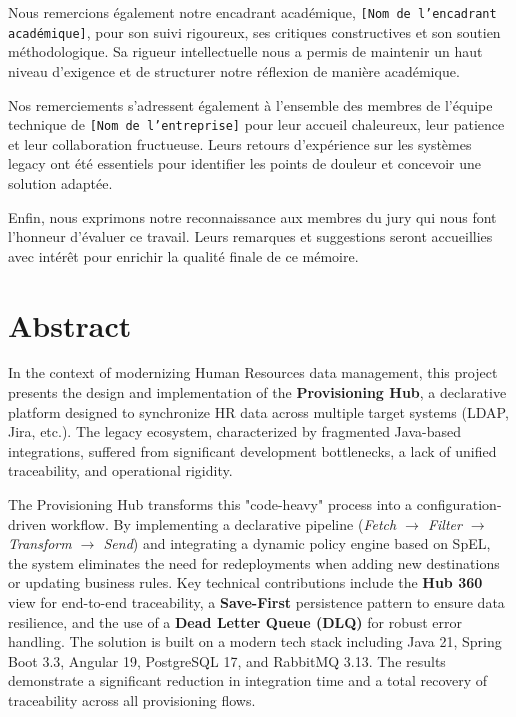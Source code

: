 Nous remercions également notre encadrant académique, \texttt{[Nom de l'encadrant académique]}, pour son suivi rigoureux, ses critiques constructives et son soutien méthodologique. Sa rigueur intellectuelle nous a permis de maintenir un haut niveau d'exigence et de structurer notre réflexion de manière académique.

Nos remerciements s'adressent également à l'ensemble des membres de l'équipe technique de \texttt{[Nom de l'entreprise]} pour leur accueil chaleureux, leur patience et leur collaboration fructueuse. Leurs retours d'expérience sur les systèmes legacy ont été essentiels pour identifier les points de douleur et concevoir une solution adaptée.

Enfin, nous exprimons notre reconnaissance aux membres du jury qui nous font l'honneur d'évaluer ce travail. Leurs remarques et suggestions seront accueillies avec intérêt pour enrichir la qualité finale de ce mémoire.
\newpage

\chapter*{Abstract}
In the context of modernizing Human Resources data management, this project presents the design and implementation of the \textbf{Provisioning Hub}, a declarative platform designed to synchronize HR data across multiple target systems (LDAP, Jira, etc.). The legacy ecosystem, characterized by fragmented Java-based integrations, suffered from significant development bottlenecks, a lack of unified traceability, and operational rigidity. 

The Provisioning Hub transforms this "code-heavy" process into a configuration-driven workflow. By implementing a declarative pipeline (\textit{Fetch $\rightarrow$ Filter $\rightarrow$ Transform $\rightarrow$ Send}) and integrating a dynamic policy engine based on SpEL, the system eliminates the need for redeployments when adding new destinations or updating business rules. Key technical contributions include the \textbf{Hub 360} view for end-to-end traceability, a \textbf{Save-First} persistence pattern to ensure data resilience, and the use of a \textbf{Dead Letter Queue (DLQ)} for robust error handling. The solution is built on a modern tech stack including Java 21, Spring Boot 3.3, Angular 19, PostgreSQL 17, and RabbitMQ 3.13. The results demonstrate a significant reduction in integration time and a total recovery of traceability across all provisioning flows.

